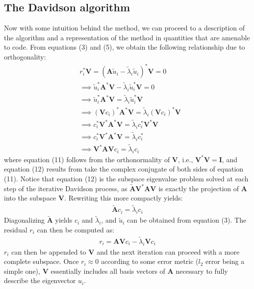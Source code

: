 \documentclass[12pt, fleqn]{article}
\begin{document}
\subsection*{The Davidson algorithm}
Now with some intuition behind the method, we can proceed to a description of the algorithm and a representation of the method in quantities that are amenable to code.
From equations (3) and (5), we obtain the following relationship due to orthogonality:
\begin{align}
    &r_i^* \mathbf{V} = (\mathbf{A} \tilde{u}_i - \tilde{\lambda}_i \tilde{u}_i)^* \mathbf{V} = 0 \\
    &\implies \tilde{u}_i^* \mathbf{A}^* \mathbf{V} - \tilde{\lambda}_i \tilde{u}_i^* \mathbf{V} = 0 \\
    &\implies \tilde{u}_i^* \mathbf{A}^* \mathbf{V} = \tilde{\lambda}_i \tilde{u}_i^* \mathbf{V} \\
    &\implies (\mathbf{V} c_i)^* \mathbf{A}^* \mathbf{V} = \tilde{\lambda}_i (\mathbf{V} c_i)^* \mathbf{V} \\
    &\implies c_i^* \mathbf{V}^* \mathbf{A}^* \mathbf{V} = \tilde{\lambda}_i c_i^* \mathbf{V}^* \mathbf{V} \\
    &\implies c_i^* \mathbf{V}^* \mathbf{A}^* \mathbf{V} = \tilde{\lambda}_i c_i^* \\
    &\implies \mathbf{V}^* \mathbf{A} \mathbf{V} c_i = \tilde{\lambda}_i c_i 
\end{align}
where equation (11) follows from the orthonormality of $\mathbf{V}$, i.e., $\mathbf{V}^* \mathbf{V} = \mathbf{I}$, and equation (12) results from take the complex conjugate of both sides of equation (11). 
Notice that equation (12) is the subspace eigenvalue problem solved at each step of the iterative Davidson process, as $\tilde{\mathbf{A}} \mathbf{V}^* \mathbf{A} \mathbf{V}$ is exactly the projection of $\mathbf{A}$ into the subspace $\mathbf{V}$. 
Rewriting this more compactly yields:
\begin{align}
    \tilde{\mathbf{A}} c_i = \tilde{\lambda}_i c_i 
\end{align}
Diagonalizing $\tilde{\mathbf{A}}$ yields $c_i$ and $\tilde{\lambda}_i$, and $\tilde{u}_i$ can be obtained from equation (3).
The residual $r_i$ can then be computed as:
\begin{align}
    r_i = \mathbf{A} \mathbf{V} c_i - \tilde{\lambda}_i \mathbf{V} c_i
\end{align}
$r_i$ can then be appended to $\mathbf{V}$ and the next iteration can proceed with a more complete subspace.
Once $r_i \approx 0$ according to some error metric ($l_2$ error being a simple one), $\mathbf{V}$ essentially includes all basis vectors of $\mathbf{A}$ necessary to fully describe the eigenvector $u_i$. \newline
\end{document}
